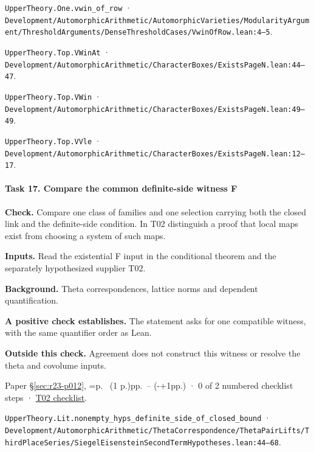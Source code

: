 \nolinkurl{UpperTheory.One.vwin_of_row} · \nolinkurl{Development/AutomorphicArithmetic/AutomorphicVarieties/ModularityArgument/ThresholdArguments/DenseThresholdCases/VwinOfRow.lean:4–5}.

\nolinkurl{UpperTheory.Top.VWinAt} · \nolinkurl{Development/AutomorphicArithmetic/CharacterBoxes/ExistsPageN.lean:44–47}.

\nolinkurl{UpperTheory.Top.VWin} · \nolinkurl{Development/AutomorphicArithmetic/CharacterBoxes/ExistsPageN.lean:49–49}.

\nolinkurl{UpperTheory.Top.VVle} · \nolinkurl{Development/AutomorphicArithmetic/CharacterBoxes/ExistsPageN.lean:12–17}.

\paragraph{Task 17. Compare the common definite-side witness F}\label{v7:task-17}

\textbf{Check.} Compare one class of families and one selection carrying both the closed link and the definite-side condition. In T02 distinguish a proof that local maps exist from choosing a system of such maps.

\textbf{Inputs.} Read the existential F input in the conditional theorem and the separately hypothesized supplier T02.

\textbf{Background.} Theta correspondences, lattice norms and dependent quantification.

\textbf{A positive check establishes.} The statement asks for one compatible witness, with the same quantifier order as Lean.

\textbf{Outside this check.} Agreement does not construct this witness or resolve the theta and covolume inputs.

Paper \S\ref{sec:r23-p012}, \ifnum{}=\relax p.\ \pageref{sec:r23-p012} (1 p.)\else pp.\ \pageref{sec:r23-p012}--\pageref{r24:synthesis} (\number\numexpr{}-+1\relax pp.)\fi{} · 0 of 2 numbered checklist steps · \href{https://github.com/GunheeC/rh-lean-verification-atlas/blob/v0.1.0/units/T02.check.md}{T02 checklist}.

\nolinkurl{UpperTheory.Lit.nonempty_hyps_definite_side_of_closed_bound} · \nolinkurl{Development/AutomorphicArithmetic/ThetaCorrespondence/ThetaPairLifts/ThirdPlaceSeries/SiegelEisensteinSecondTermHypotheses.lean:44–68}.

